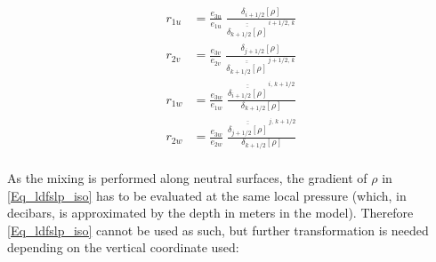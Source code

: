 {\begin{equation} \label{Eq_ldfslp_iso}
\begin{split}
 r_{1u} &= \frac{e_{3u}}{e_{1u}}\; \frac{\delta_{i+1/2}[\rho]}
 								{\overline{\overline{\delta_{k+1/2}[\rho]}}^{\,i+1/2,\,k}}
\\
 r_{2v} &= \frac{e_{3v}}{e_{2v}}\; \frac{\delta_{j+1/2}\left[\rho \right]}
 								{\overline{\overline{\delta_{k+1/2}[\rho]}}^{\,j+1/2,\,k}}
\\
 r_{1w} &= \frac{e_{3w}}{e_{1w}}\; 
 			\frac{\overline{\overline{\delta_{i+1/2}[\rho]}}^{\,i,\,k+1/2}}
				 {\delta_{k+1/2}[\rho]}
\\
 r_{2w} &= \frac{e_{3w}}{e_{2w}}\; 
 			\frac{\overline{\overline{\delta_{j+1/2}[\rho]}}^{\,j,\,k+1/2}}
				 {\delta_{k+1/2}[\rho]}
\\
\end{split}
\end{equation}




As the mixing is performed along neutral surfaces, the gradient of $\rho$ in 
\eqref{Eq_ldfslp_iso} has to be evaluated at the same local pressure (which, 
in decibars, is approximated by the depth in meters in the model). Therefore 
\eqref{Eq_ldfslp_iso} cannot be used as such, but further transformation is 
needed depending on the vertical coordinate used:

\begin{description}


\end{description}}

